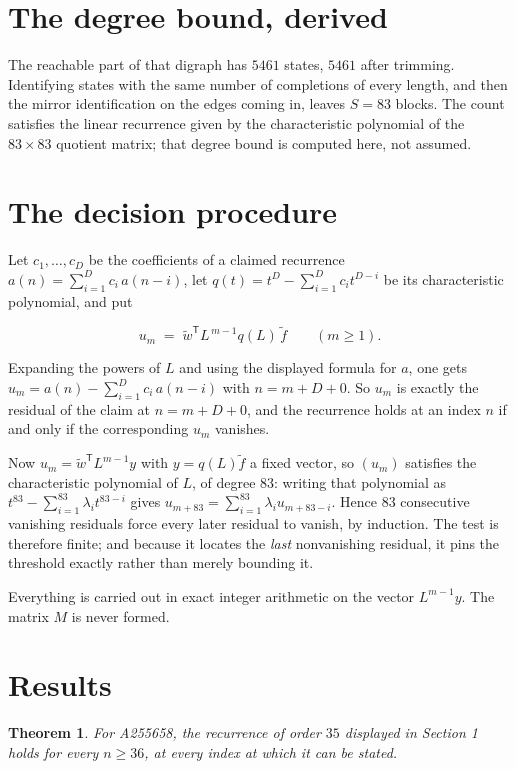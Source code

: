 \documentclass[11pt]{article}
\newtheorem{theorem}{Theorem}
\theoremstyle{definition}
\begin{document}
\section{The degree bound, derived}

The reachable part of that digraph has $5461$ states, $5461$ after trimming. Identifying states with the same number of completions of every length, and then the mirror identification on the edges coming in, leaves $S = 83$ blocks. The count satisfies the linear recurrence given by the characteristic polynomial of the $83\times83$ quotient matrix; that degree bound is computed here, not assumed.

\section{The decision procedure}

Let $c_1,\dots,c_D$ be the coefficients of a claimed recurrence $a(n) = \sum_{i=1}^{D} c_i\,a(n-i)$, let $q(t) = t^{D} - \sum_{i=1}^{D} c_i t^{D-i}$ be its characteristic polynomial, and put

\[u_m \;=\; \tilde w^{\mathsf T} L^{\,m-1} q(L)\,\tilde f \qquad (m \ge 1).\]

Expanding the powers of $L$ and using the displayed formula for $a$, one gets $u_m = a(n) - \sum_{i=1}^{D} c_i\,a(n-i)$ with $n = m + D + 0$. So $u_m$ is exactly the residual of the claim at $n = m + D + 0$, and the recurrence holds at an index $n$ if and only if the corresponding $u_m$ vanishes.

Now $u_m = \tilde w^{\mathsf T} L^{m-1} y$ with $y = q(L)\tilde f$ a fixed vector, so $(u_m)$ satisfies the characteristic polynomial of $L$, of degree $83$: writing that polynomial as $t^{83} - \sum_{i=1}^{83} \lambda_i t^{83-i}$ gives $u_{m+83} = \sum_{i=1}^{83} \lambda_i u_{m+83-i}$. Hence $83$ consecutive vanishing residuals force every later residual to vanish, by induction. The test is therefore finite; and because it locates the {\itshape last} nonvanishing residual, it pins the threshold exactly rather than merely bounding it.

Everything is carried out in exact integer arithmetic on the vector $L^{m-1}y$. The matrix $M$ is never formed.

\section{Results}

\begin{theorem} For A255658, the recurrence of order $35$ displayed in Section 1 holds for every $n \ge 36$, at every index at which it can be stated.\end{theorem}
\end{document}
